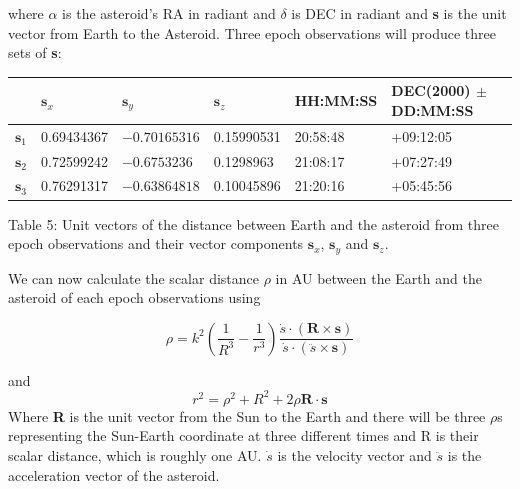 \documentclass[onecolumn, 12pt, a4paper]{article}
\begin{document}
where $\alpha$ is the asteroid's RA in radiant and $\delta$ is DEC in radiant and \textbf{s} is the unit vector from Earth to the Asteroid. Three epoch observations will produce three sets of \textbf{s}: \newline

\hspace*{-.5cm}\begin{tabular}{ |p{1cm}|p{2.5cm}|p{2.5cm}|p{2.3cm}|p{2.3cm}|p{2.5cm}|}

 \hline
  & $\textbf{s}_x$ & $\textbf{s}_y$ & $\textbf{s}_z$ & HH:MM:SS & DEC(2000) $\pm$DD:MM:SS\\
 \hline
 $\textbf{s}_1$ & 0.69434367 & $-0.70165316$ & 0.15990531 & 20:58:48 & +09:12:05\\
 \hline
 $\textbf{s}_2$ & 0.72599242 & $-0.6753236$ &  0.1298963 & 21:08:17 & +07:27:49 \\
 \hline
 $\textbf{s}_3$ & 0.76291317 & $-0.63864818$ & 0.10045896 & 21:20:16 & +05:45:56 \\
 \hline
\end{tabular}
\newline
\newline

Table 5: Unit vectors of the distance between Earth and the asteroid from three epoch observations and their vector components  $\textbf{s}_x$,  $\textbf{s}_y$ and  $\textbf{s}_z$. \newline

We can now calculate the scalar distance $\rho$ in AU between the Earth and the asteroid of each epoch observations using \newline

\begin{equation}\label{}
\rho = k^2(\dfrac{1}{R^3} - \dfrac{1}{r^3}) \dfrac{\dot{s}\cdot(\textbf{R}\times\textbf{s})}{\dot{s}\cdot(\ddot{s}\times\textbf{s})}
\end{equation}
\newline

and 
\begin{equation}\label{}
r^2 = \rho^2 + R^2 + 2\rho\textbf{R}\cdot\textbf{s}
\end{equation}
\newline
Where \textbf{R} is the unit vector from the Sun to the Earth and there will be three $\rho$s representing the Sun-Earth coordinate at three different times and R is their scalar distance, which is roughly one AU. $\dot{s}$ is the velocity vector and $\ddot{s}$ is the acceleration vector of the asteroid. \newline
\end{document}
